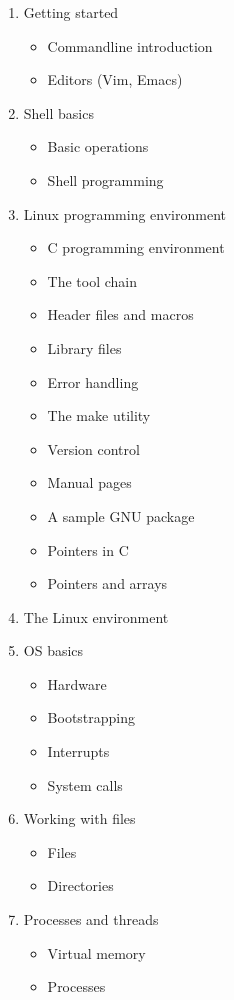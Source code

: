 \documentclass{wx672ctexart}
\begin{document}
\begin{enumerate}
\item Getting started
  \begin{itemize}
  \item Commandline introduction
  \item Editors (Vim, Emacs)
  \end{itemize}
\item Shell basics
  \begin{itemize}
  \item Basic operations
  \item Shell programming
  \end{itemize}
\item Linux programming environment
  \begin{itemize}
  \item C programming environment
  \item The tool chain
  \item Header files and macros
  \item Library files
  \item Error handling
  \item The make utility
  \item Version control
  \item Manual pages
  \item A sample GNU package
  \item Pointers in C
  \item Pointers and arrays
  \end{itemize}
\item The Linux environment
\item OS basics
  \begin{itemize}
  \item Hardware
  \item Bootstrapping
  \item Interrupts
  \item System calls
  \end{itemize}
\item Working with files
  \begin{itemize}
  \item Files
  \item Directories
  \end{itemize}
\item Processes and threads
  \begin{itemize}
  \item Virtual memory
  \item Processes

\end{itemize}
\end{enumerate}
\end{document}

